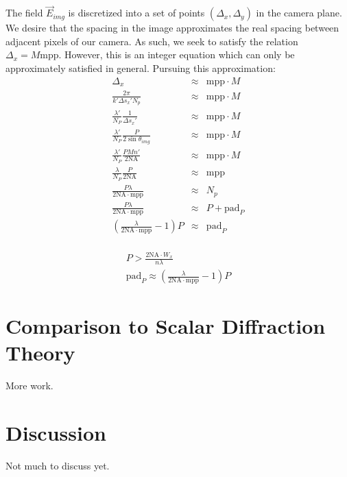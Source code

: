   The field $\vec{E}_{img}$ is discretized into a set of points 
  $\left ( \Delta_x, \Delta_y \right )$ in the camera plane. We desire that the
  spacing in the image approximates the real spacing between adjacent 
  pixels of our camera. As such, we seek to satisfy the relation 
  $\Delta_x = M\text{mpp}$. However, this is an integer equation which can only
  be approximately satisfied in general. Pursuing this approximation:
  \begin{eqnarray*}
    \Delta_x &\approx& \text{mpp}\cdot M \\
    \frac{2 \pi}{k' \Delta s_x' N_p} &\approx& \text{mpp}\cdot M \\
    \frac{\lambda'}{N_P} \frac{1}{\Delta s_x'} &\approx& \text{mpp}\cdot M \\
    \frac{\lambda'}{N_P} \frac{P}{2 \sin{\theta_{img}}} &\approx& \text{mpp}\cdot M \\
    \frac{\lambda'}{N_P} \frac{PMn'}{2\text{NA}} &\approx& \text{mpp}\cdot M \\
    \frac{\lambda}{N_P} \frac{P}{2\text{NA}} &\approx& \text{mpp} \\
    \frac{P\lambda}{2\text{NA}\cdot\text{mpp}} &\approx& N_p \\
    \frac{P\lambda}{2\text{NA}\cdot\text{mpp}} &\approx& P+\text{pad}_P \\
    \left ( \frac{\lambda}{2\text{NA}\cdot\text{mpp}} - 1 \right )P &\approx& \text{pad}_P \\    
  \end{eqnarray*}

  \begin{equation*}
    \begin{split}
      P > \frac{2 \text{NA}\cdot W_x}{n\lambda} \\
      \text{pad}_P  \approx  \left ( \frac{\lambda}{2\text{NA}\cdot\text{mpp}} - 1 \right )P
    \end{split}
  \end{equation*}


  
\section{Comparison to Scalar Diffraction Theory}

More work.

\section{Discussion}

Not much to discuss yet.


